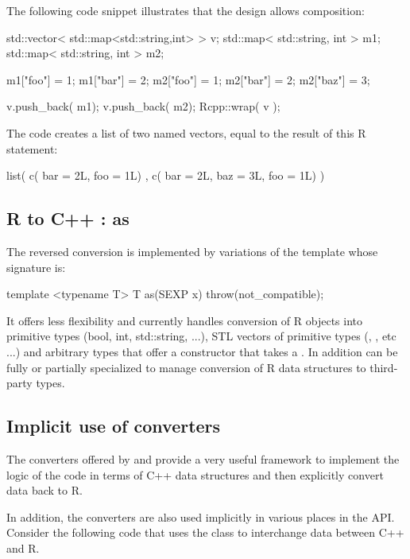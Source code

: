 The following code snippet illustrates that the design allows
composition:

\begin{example}
std::vector< std::map<std::string,int> > v;
std::map< std::string, int > m1;
std::map< std::string, int > m2;

m1["foo"] = 1; m1["bar"] = 2;
m2["foo"] = 1; m2["bar"] = 2; m2["baz"] = 3;

v.push_back( m1);
v.push_back( m2);
Rcpp::wrap( v );
\end{example}

The code creates a list of two named vectors, equal to the 
result of this R statement:

\begin{example}
list( c( bar = 2L, foo = 1L) , 
      c( bar = 2L, baz = 3L, foo = 1L) )
\end{example}

\subsection{R to C++ : as}

The reversed conversion is implemented by variations of the 
 template whose signature is:
\begin{example}
template <typename T> 
T as(SEXP x) throw(not_compatible);
\end{example}

It offers less flexibility and currently
handles conversion of R objects into primitive types (bool, int, std::string, ...), 
STL vectors of primitive types  (, 
, etc ...) and arbitrary types that offer 
a constructor that takes a . In addition  can 
be fully or partially specialized to manage conversion of R data 
structures to third-party types.



\subsection{Implicit use of converters}

The converters offered by  and  provide a very 
useful framework to implement the logic of the code in terms of C++ 
data structures and then explicitly convert data back to R. 

In addition, the converters are also used implicitly
in various places in the  API. 
Consider the following code that uses the  class to 
interchange data between C++ and R.

